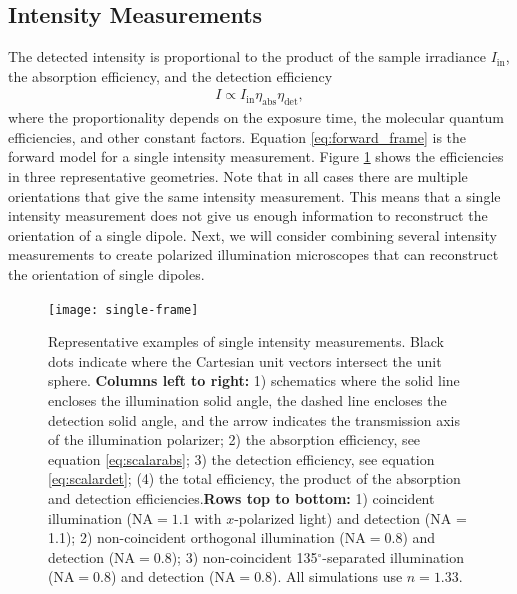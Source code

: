 \documentclass[10pt]{article}
\begin{document}
\subsection{Intensity Measurements}\label{forward}
The detected intensity is proportional to the product of the sample irradiance
$I_{\text{in}}$, the absorption efficiency, and the detection efficiency
\begin{align}
  I \propto I_{\text{in}}\eta_{\text{abs}}\eta_{\text{det}}\label{eq:forward_frame},
\end{align}
where the proportionality depends on the exposure time, the molecular quantum
efficiencies, and other constant factors. Equation \ref{eq:forward_frame} is the
forward model for a single intensity measurement. Figure \ref{fig:single-frame}
shows the efficiencies in three representative geometries. Note that in all
cases there are multiple orientations that give the same intensity
measurement. This means that a single intensity measurement does not give us
enough information to reconstruct the orientation of a single dipole. Next, we
will consider combining several intensity measurements to create polarized
illumination microscopes that can reconstruct the orientation of single
dipoles.

\begin{figure}[H]
\centering\texttt{[image: single-frame]}
\caption{Representative examples of single intensity measurements. Black dots
  indicate where the Cartesian unit vectors intersect the unit sphere. \newline \newline \textbf{Columns left to right:} 1) schematics where
  the solid line encloses the illumination solid angle, the dashed line encloses
  the detection solid angle, and the arrow indicates the transmission axis of
  the illumination polarizer; 2) the absorption efficiency, see equation
  \ref{eq:scalarabs}; 3) the detection efficiency, see equation
  \ref{eq:scalardet}; (4) the total efficiency, the product of the absorption
  and detection efficiencies.\newline \newline \textbf{Rows top to bottom:} 1)
  coincident illumination ($\text{NA} = 1.1$ with $x$-polarized light) and
  detection (NA = 1.1); 2) non-coincident orthogonal illumination
  ($\text{NA} = 0.8$) and detection ($\text{NA} = 0.8$); 3) non-coincident
  135${}^{\circ}$-separated illumination ($\text{NA} = 0.8$) and detection
  ($\text{NA} = 0.8$). All simulations use $n=1.33$.}
  \label{fig:single-frame}
\end{figure}
\end{document}
